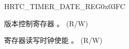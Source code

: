 \begin{register}{H}{RTC\_TIMER\_DATE\_REG}{0x03FC}\label{regdesc:RTCTIMERDATEREG}
%
%
\regnewline%
\begin{regdesc}\begin{reglist}
\label{fielddesc:RTCTIMERDATE}
\item [RTC\_TIMER\_DATE] 版本控制寄存器 。 (R/W)
\label{fielddesc:RTCTIMERCLKEN}
\item [RTC\_TIMER\_CLK\_EN] 寄存器读写时钟使能 。 (R/W)
\end{reglist}\end{regdesc}
\end{register}

